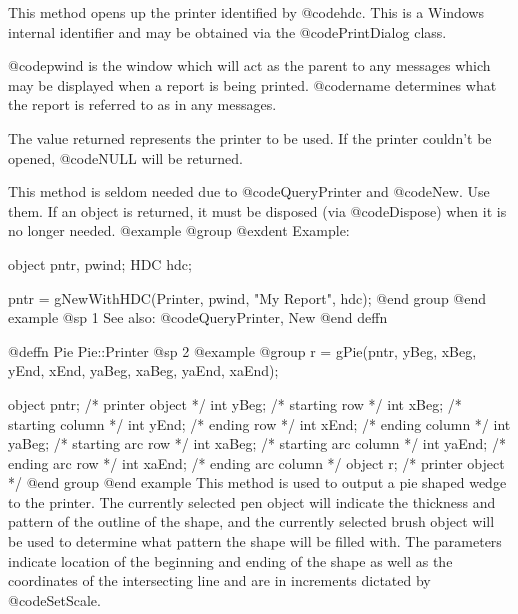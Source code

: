 This method opens up the printer identified by @code{hdc}.  This is
a Windows internal identifier and may be obtained via the
@code{PrintDialog} class.

@code{pwind} is the window which will act as the parent to any
messages which may be displayed when a report is being printed.
@code{rname} determines what the report is referred to as in any
messages.

The value returned represents the printer to be used.  If the 
printer couldn't be opened, @code{NULL} will be returned.

This method is seldom needed due to @code{QueryPrinter} and @code{New}.
Use them. If an object is returned, it must be disposed (via
@code{Dispose}) when it is no longer needed.
@example
@group
@exdent Example:

object  pntr, pwind;
HDC     hdc;

pntr = gNewWithHDC(Printer, pwind, "My Report", hdc);
@end group
@end example
@sp 1
See also:  @code{QueryPrinter, New}
@end deffn



















@deffn {Pie} Pie::Printer
@sp 2
@example
@group
r = gPie(pntr, yBeg, xBeg, yEnd, xEnd, yaBeg, xaBeg, yaEnd, xaEnd);

object  pntr;   /*  printer object         */
int     yBeg;   /*  starting row           */
int     xBeg;   /*  starting column        */
int     yEnd;   /*  ending row             */
int     xEnd;   /*  ending column          */
int     yaBeg;  /*  starting arc row       */
int     xaBeg;  /*  starting arc column    */
int     yaEnd;  /*  ending arc row         */
int     xaEnd;  /*  ending arc column      */
object  r;      /*  printer object         */
@end group
@end example
This method is used to output a pie shaped wedge to the printer.  The
currently selected pen object will indicate the thickness and pattern of
the outline of the shape, and the currently selected brush object will
be used to determine what pattern the shape will be filled with.  The
parameters indicate location of the beginning and ending of the shape as
well as the coordinates of the intersecting line and are in increments
dictated by @code{SetScale}.

